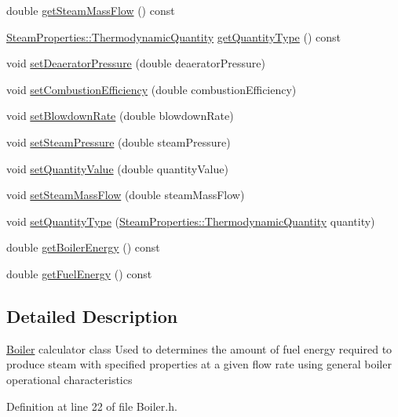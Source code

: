 \begin{DoxyCompactItemize}
\item 
double \hyperlink{class_boiler_a4101e71234995558a451dcab145b5fc9}{get\+Steam\+Mass\+Flow} () const
\item 
\hyperlink{class_steam_properties_ae0294bedf7d178c2d8fb6aed0f62fbff}{Steam\+Properties\+::\+Thermodynamic\+Quantity} \hyperlink{class_boiler_a26a71f789c9f9e05bd43a1ca0219f920}{get\+Quantity\+Type} () const
\item 
void \hyperlink{class_boiler_a56f422254606ebba1248ae0b4f8f0215}{set\+Deaerator\+Pressure} (double deaerator\+Pressure)
\item 
void \hyperlink{class_boiler_abef6bc48101f98f0650cb07fb1d51f74}{set\+Combustion\+Efficiency} (double combustion\+Efficiency)
\item 
void \hyperlink{class_boiler_a66c0e4c577dbd3f52dcf202e69a08371}{set\+Blowdown\+Rate} (double blowdown\+Rate)
\item 
void \hyperlink{class_boiler_a0a4619ff73c9969daebe3aa66ddad6be}{set\+Steam\+Pressure} (double steam\+Pressure)
\item 
void \hyperlink{class_boiler_ac3450d88dba124529d59baf62c39e14a}{set\+Quantity\+Value} (double quantity\+Value)
\item 
void \hyperlink{class_boiler_ada7af5896a2a4701d78a532dc9bc9892}{set\+Steam\+Mass\+Flow} (double steam\+Mass\+Flow)
\item 
void \hyperlink{class_boiler_a9c5b20cae6133c9174b12760f36d52c2}{set\+Quantity\+Type} (\hyperlink{class_steam_properties_ae0294bedf7d178c2d8fb6aed0f62fbff}{Steam\+Properties\+::\+Thermodynamic\+Quantity} quantity)
\item 
double \hyperlink{class_boiler_a8cc9ad5f1b36f5dcbcb225e9e3d13a39}{get\+Boiler\+Energy} () const
\item 
double \hyperlink{class_boiler_a55542a761669c842163b20932f9747d3}{get\+Fuel\+Energy} () const
\end{DoxyCompactItemize}


\subsection{Detailed Description}
\hyperlink{class_boiler}{Boiler} calculator class Used to determines the amount of fuel energy required to produce steam with specified properties at a given flow rate using general boiler operational characteristics 

Definition at line 22 of file Boiler.\+h.



